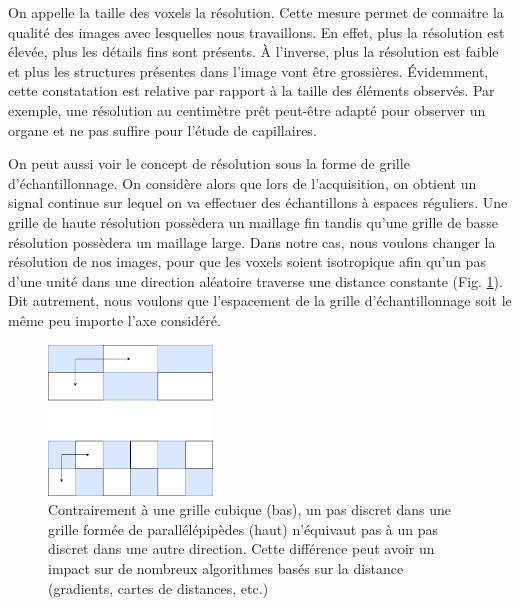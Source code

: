 On appelle la taille des voxels la résolution. Cette mesure permet de connaitre la qualité des images avec lesquelles nous travaillons. En effet, plus la résolution est élevée, plus les détails fins sont présents. À l'inverse, plus la résolution est faible et plus les structures présentes dans l'image vont être grossières. Évidemment, cette constatation est relative par rapport à la taille des éléments observés. Par exemple, une résolution au centimètre prêt peut-être adapté pour observer un organe et ne pas suffire pour l'étude de capillaires.

On peut aussi voir le concept de résolution sous la forme de grille d'échantillonnage. On considère alors que lors de l'acquisition, on obtient un signal continue sur lequel on va effectuer des échantillons à espaces réguliers. Une grille de haute résolution possèdera un maillage fin tandis qu'une grille de basse résolution possèdera un maillage large. Dans notre cas, nous voulons changer la résolution de nos images, pour que les voxels soient isotropique afin qu'un pas d'une unité dans une direction aléatoire traverse une distance constante (Fig. \ref{fig:resolution_voxels_shapes}). Dit autrement, nous voulons que l'espacement de la grille d'échantillonnage soit le même peu importe l'axe considéré.

\begin{figure}[h]
  \centering
  \includegraphics[height=4cm]{Images/resolution_voxels_shape.png}
  \caption{Contrairement à une grille cubique (bas), un pas discret dans une grille formée de parallélépipèdes (haut) n'équivaut pas à un pas discret dans une autre direction. Cette différence peut avoir un impact sur de nombreux algorithmes basés sur la distance (gradients, cartes de distances, etc.)}
  \label{fig:resolution_voxels_shapes}
\end{figure}

